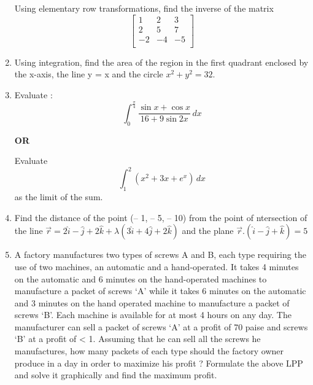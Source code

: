 \documentclass[journal,12pt,twocolumn]{IEEEtran}
\begin{document}
\begin{enumerate}
     Using elementary row transformations, find the inverse of the matrix
     $$\begin{bmatrix}
     1 & 2 & 3 \\
     2 & 5 & 7 \\
     -2 & -4 & -5 \\
     \end{bmatrix} $$
     
     \item Using integration, find the area of the region in the first quadrant enclosed by the x-axis, the line y = x and the circle $x^{2} + y^{2} = 32$.
     
     \item Evaluate :
     $$ \int_{0}^{\frac{\pi}{4}} \frac{\sin x + \cos x}{16 + 9\sin 2x} \,dx $$
     
     \begin{center}
     \textbf{OR}
     \end{center}
     
     Evaluate
     $$ \int_{1}^{2} (x^{2} + 3x + e^{x}) \,dx $$
     as the limit of the sum.
     
     \item Find the distance of the point (– 1, – 5, – 10) from the point of ntersection of the line $\vec{r} = 2\hat{i} - \hat{j} + 2\hat{k} +\lambda(3\hat{i} + 4\hat{j} + 2\hat{k})$ and the plane $\vec{r}$.$(\hat{i} - \hat{j} + \hat{k}) = 5$
     
     \item A factory manufactures two types of screws A and B, each type requiring the use of two machines, an automatic and a hand-operated. It takes 4 minutes on the automatic and 6 minutes on the hand-operated machines to manufacture a packet of screws ‘A’ while it takes 6 minutes
on the automatic and 3 minutes on the hand operated machine to manufacture a packet of screws ‘B’. Each machine is available for at most
4 hours on any day. The manufacturer can sell a packet of screws ‘A’ at a profit of 70 paise and screws ‘B’ at a profit of < 1. Assuming that he can sell all the screws he manufactures, how many packets of each type should the factory owner produce in a day in order to maximize his profit ? Formulate the above LPP and solve it graphically and find the maximum profit.
     
    
    
     
     
     
     \end{enumerate}
\end{document}
